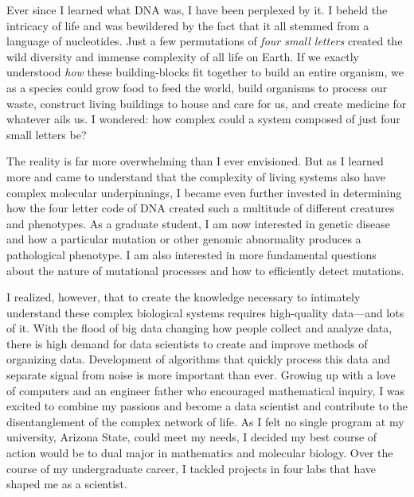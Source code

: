 \documentclass[12pt]{article}
\begin{document}
Ever since I learned what DNA was, I have been perplexed by it. I beheld the intricacy of life and was bewildered by the fact that it all stemmed from a language of nucleotides. Just a few permutations of \textit{four small letters} created the wild diversity and immense complexity of all life on Earth. If we exactly understood \textit{how} these building-blocks fit together to build an entire organism, we as a species could grow food to feed the world, build organisms to process our waste, construct living buildings to house and care for us, and create medicine for whatever ails us. I wondered: how complex could a system composed of just four small letters be?

The reality is far more overwhelming than I ever envisioned.
But as I learned more and came to understand that the complexity of living systems also have complex molecular underpinnings, I became even further invested in determining how the four letter code of DNA created such a multitude of different creatures and phenotypes.
As a graduate student, I am now interested in genetic disease and how a particular mutation or other genomic abnormality produces a pathological phenotype. I am also interested in more fundamental questions about the nature of mutational processes and how to efficiently detect mutations.


I realized, however, that to create the knowledge necessary to intimately understand these complex biological systems requires high-quality data---and lots of it. With the flood of big data changing how people collect and analyze data, there is high demand for data scientists to create and improve methods of organizing data. Development of algorithms that quickly process this data and separate signal from noise is more important than ever. Growing up with a love of computers and an engineer father who encouraged mathematical inquiry, I was excited to combine my passions and become a data scientist and contribute to the disentanglement of the complex network of life. As I felt no single program at my university, Arizona State, could meet my needs, I decided my best course of action would be to dual major in mathematics and molecular biology. Over the course of my undergraduate career, I tackled projects in four labs that have shaped me as a scientist.
\end{document}
